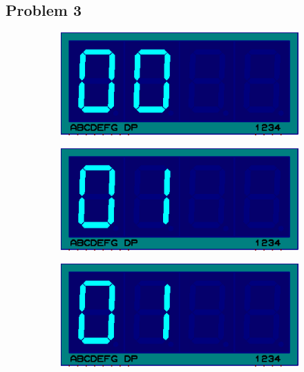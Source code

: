 \documentclass{lab_sheet}
\begin{document}
    \subsection*{Problem 3}
    \begin{figure}[H]
        \begin{subfigure}{.33\textwidth}
          \centering
          \includegraphics[frame,width=.9\linewidth]{../Figures/f0}  
          \label{fig:prob3-a}
          \caption{}
        \end{subfigure}
        \begin{subfigure}{.33\textwidth}
          \centering
          \includegraphics[frame,width=.9\linewidth]{../Figures/f1}  
          \label{fig:prob3-b}
          \caption{}
        \end{subfigure}
        \begin{subfigure}{.33\textwidth}
          \centering
            \includegraphics[frame,width=.9\linewidth]{../Figures/f1}  
          \label{fig:prob3-c}
          \caption{}

\end{subfigure}
\end{figure}
\end{document}
